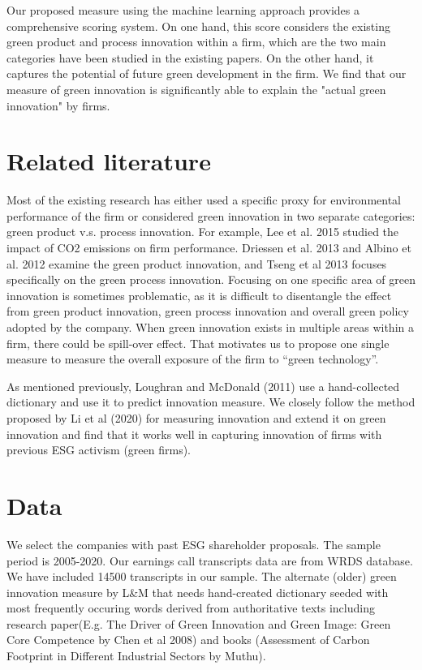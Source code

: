 \documentclass[10pt]{article}
\begin{document}
Our proposed measure using the machine learning approach provides a comprehensive scoring system. On one hand, this score considers the existing green product and process innovation within a firm, which are the two main categories have been studied in the existing papers. On the other hand, it captures the potential of future green development in the firm. We find that our measure of green innovation is significantly able to explain the "actual green innovation" by firms.


\section{Related literature}

Most of the existing research has either used a specific proxy for environmental performance of the firm or considered green innovation in two separate categories: green product v.s. process innovation. For example, Lee et al. 2015 studied the impact of CO2 emissions on firm performance. Driessen et al. 2013 and Albino et al. 2012 examine the green product innovation, and Tseng et al 2013 focuses specifically on the green process innovation. Focusing on one specific area of green innovation is sometimes problematic, as it is difficult to disentangle the effect from green product innovation, green process innovation and overall green policy adopted by the company. When green innovation exists in multiple areas within a firm, there could be spill-over effect. That motivates us to propose one single measure to measure the overall exposure of the firm to “green technology”. 

As mentioned previously, Loughran and McDonald (2011) use a hand-collected dictionary and use it to predict innovation measure. We closely follow the method proposed by Li et al (2020) for measuring innovation and extend it on green innovation and find that it works well in capturing innovation of firms with previous ESG activism (green firms).





\section{Data}
We select the companies with past ESG shareholder proposals. The sample period is 2005-2020. Our earnings call transcripts data are from WRDS database. We have included 14500 transcripts in our sample. The alternate (older) green innovation measure by L\&M that needs hand-created dictionary seeded with most frequently occuring words derived from authoritative texts including research paper(E.g. The Driver of Green Innovation and Green Image: Green Core Competence by Chen et al 2008) and books (Assessment of Carbon Footprint in Different Industrial Sectors by Muthu).
\end{document}
